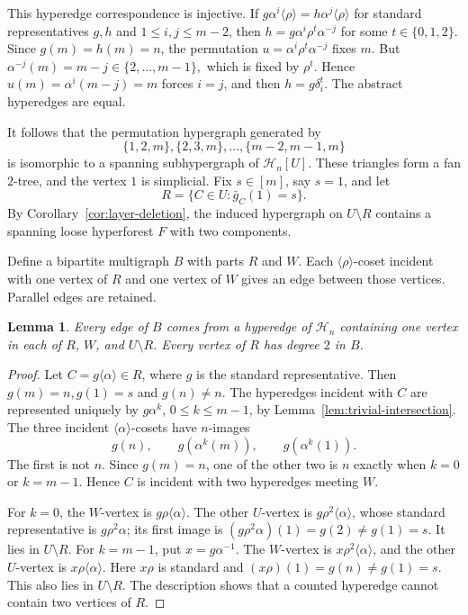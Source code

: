\documentclass[4pt]{article} %
\newtheorem{lemma}[theorem]{Lemma}
\newcommand{\la}{\langle}
\newcommand{\ra}{\rangle}
\begin{document}
This hyperedge correspondence is injective. If
$
 g\alpha^i\la\rho\ra=h\alpha^j\la\rho\ra
$
for standard representatives $g,h$ and $1\leq i,j\leq m-2$, then
$
 h=g\alpha^i\rho^t\alpha^{-j}
$
for some $t\in\{0,1,2\}$. Since $g(m)=h(m)=n$, the permutation
$u=\alpha^i\rho^t\alpha^{-j}$ fixes $m$. But
$
 \alpha^{-j}(m)=m-j\in\{2,\ldots,m-1\},
$
which is fixed by $\rho^t$. Hence $u(m)=\alpha^i(m-j)=m$ forces $i=j$,
and then $h=g\delta_i^t$. The abstract hyperedges are equal.

It follows that the permutation hypergraph generated by
\begin{equation}\label{eq:fan}
 \{1,2,m\},\{2,3,m\},\ldots,\{m-2,m-1,m\}
\end{equation}
is isomorphic to a spanning subhypergraph of $\mathcal H_n[U]$. These
triangles form a fan $2$-tree, and the vertex $1$ is simplicial. Fix
$s\in[m]$, say $s=1$, and let
\begin{equation}\label{eq:R}
 R=\{C\in U:\bar g_C(1)=s\}.
\end{equation}
By Corollary~\ref{cor:layer-deletion}, the induced hypergraph on
$U\setminus R$ contains a spanning loose hyperforest $F$ with two
components.

Define a bipartite multigraph $B$ with parts $R$ and $W$. Each
$\la\rho\ra$-coset incident with one vertex of $R$ and one vertex of $W$
gives an edge between those vertices. Parallel edges are retained.

\begin{lemma}\label{lem:B-local}
Every edge of $B$ comes from a hyperedge of $\mathcal H_n$ containing one
vertex in each of $R$, $W$, and $U\setminus R$. Every vertex of $R$ has
degree $2$ in $B$.
\end{lemma}

\begin{proof}
Let $C=g\la\alpha\ra\in R$, where $g$ is the standard representative.
Then
$
 g(m)=n, g(1)=s $ and $g(n)\neq n.
$
The hyperedges incident with $C$ are represented uniquely by
$g\alpha^k$, $0\leq k\leq m-1$, by
Lemma~\ref{lem:trivial-intersection}. The three incident
$\la\alpha\ra$-cosets have $n$-images
\begin{equation}\label{eq:n-images}
 g(n),\qquad g(\alpha^k(m)),\qquad g(\alpha^k(1)).
\end{equation}
The first is not $n$. Since $g(m)=n$, one of the other two is $n$ exactly
when $k=0$ or $k=m-1$. Hence $C$ is incident with two hyperedges meeting
$W$.

For $k=0$, the $W$-vertex is $g\rho\la\alpha\ra$. The other $U$-vertex is
$g\rho^2\la\alpha\ra$, whose standard representative is $g\rho^2\alpha$;
its first image is
$
 (g\rho^2\alpha)(1)=g(2)\neq g(1)=s.
$
It lies in $U\setminus R$. For $k=m-1$, put $x=g\alpha^{-1}$. The
$W$-vertex is $x\rho^2\la\alpha\ra$, and the other $U$-vertex is
$x\rho\la\alpha\ra$. Here $x\rho$ is standard and
$
 (x\rho)(1)=g(n)\neq g(1)=s.
$
This also lies in $U\setminus R$. The description shows that a counted
hyperedge cannot contain two vertices of $R$.
\end{proof}
\end{document}
